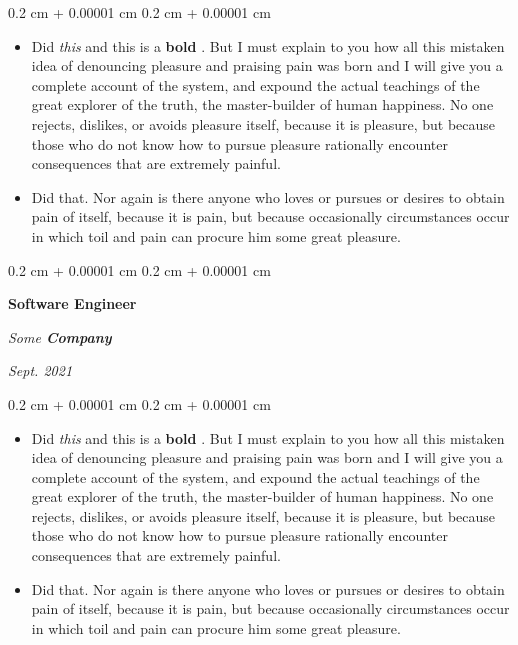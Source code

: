 \documentclass[10pt, letterpaper]{article}
\newenvironment{highlights}{
    \begin{itemize}[
        topsep=0.10 cm,
        parsep=0.10 cm,
        partopsep=0pt,
        itemsep=0pt,
        leftmargin=0.4 cm + 10pt
    ]
}{
    \end{itemize}
} %
\newenvironment{onecolentry}{
    \begin{adjustwidth}{
        0.2 cm + 0.00001 cm
    }{
        0.2 cm + 0.00001 cm
    }
}{
    \end{adjustwidth}
} %
\newenvironment{twocolentry}[2][]{
    \onecolentry
    \def\secondColumn{#2}
    \setcolumnwidth{\fill, 4.5 cm}
    \begin{paracol}{2}
}{
    \switchcolumn \raggedleft \secondColumn
    \end{paracol}
    \endonecolentry
} %
\let\hrefWithoutArrow\href
\renewcommand{\href}[2]{\hrefWithoutArrow{#1}{\mbox{\ifthenelse{\equal{#2}{}}{ }{#2 }\raisebox{.15ex}{\footnotesize \faExternalLink*}}}}
\begin{document}
        \vspace{0.10 cm-3px}
        \begin{onecolentry}
            \begin{highlights}
                \item Did \textit{this} and this is a \textbf{bold} \href{https://example.com}{link}. But I must explain to you how all this mistaken idea of denouncing pleasure and praising pain was born and I will give you a complete account of the system, and expound the actual teachings of the great explorer of the truth, the master-builder of human happiness. No one rejects, dislikes, or avoids pleasure itself, because it is pleasure, but because those who do not know how to pursue pleasure rationally encounter consequences that are extremely painful.
                \item Did that. Nor again is there anyone who loves or pursues or desires to obtain pain of itself, because it is pain, but because occasionally circumstances occur in which toil and pain can procure him some great pleasure.
            \end{highlights}
        \end{onecolentry}


        \vspace{0.2 cm-3px}

        \begin{twocolentry}{
            
            
        \textit{Sept. 2021}}
            \textbf{Software Engineer}
            
            \textit{Some \textbf{Company}}
        \end{twocolentry}

        \vspace{0.10 cm-3px}
        \begin{onecolentry}
            \begin{highlights}
                \item Did \textit{this} and this is a \textbf{bold} \href{https://example.com}{link}. But I must explain to you how all this mistaken idea of denouncing pleasure and praising pain was born and I will give you a complete account of the system, and expound the actual teachings of the great explorer of the truth, the master-builder of human happiness. No one rejects, dislikes, or avoids pleasure itself, because it is pleasure, but because those who do not know how to pursue pleasure rationally encounter consequences that are extremely painful.
                \item Did that. Nor again is there anyone who loves or pursues or desires to obtain pain of itself, because it is pain, but because occasionally circumstances occur in which toil and pain can procure him some great pleasure.
            \end{highlights}
        \end{onecolentry}
\end{document}
